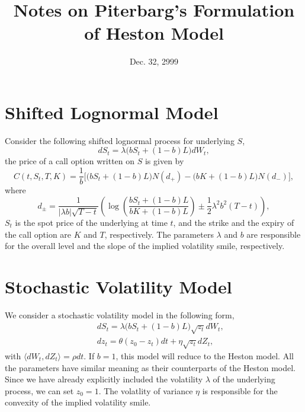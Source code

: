 \documentclass[12pt]{article}
\begin{document}
\title{Notes on Piterbarg's Formulation of Heston Model}
\date{Dec. 32, 2999}

\maketitle

\section{Shifted Lognormal Model}

  Consider the following shifted lognormal process for underlying $S$,
  \begin{equation}
    dS_t=\lambda \bigg(bS_t+\left(1-b\right)L\bigg)dW_t,
  \end{equation}
  the price of a call option written on $S$ is given by
  \begin{equation}
    C(t,S_t,T,K) = \frac{1}{b}\Big[\bigg(bS_t+\left(1-b\right)L\bigg)N\left(d_+\right)
                 - \bigg(bK+\left(1-b\right)L\bigg)N\left(d_-\right)\Big],
  \end{equation}
  where
  \begin{equation}
    d_{\pm} = \frac{1}{\left|\lambda b\right|\sqrt{T-t}}\left(\log\left(\frac{bS_t+\left(1-b\right)L}{bK+\left(1-b\right)L}\right)
            \pm \frac{1}{2}\lambda^2b^2(T-t)\right),
  \end{equation}
  $S_t$ is the spot price of the underlying at time $t$, and the strike and the expiry
  of the call option are $K$ and $T$, respectively. The parameters $\lambda$ and $b$ are
  responsible for the overall level and the slope of the implied volatility smile, respectively.

\section{Stochastic Volatility Model}

  We consider a stochastic volatility model in the following form,
  \begin{eqnarray}
    &&dS_t=\lambda \bigg(bS_t+\left(1-b\right)L\bigg)\sqrt{z_t}dW_t,\\
    &&dz_t=\theta(z_0-z_t)dt+\eta\sqrt{z_t}dZ_t,
  \end{eqnarray}
  with $\langle dW_t, dZ_t \rangle = \rho dt$. If $b=1$, this model will reduce to the
  Heston model. All the parameters have similar meaning as their counterparts of the
  Heston model. Since we have already explicitly included the volatility $\lambda$ of the underlying
  process, we can set $z_0=1$. The volatlity of variance $\eta$ is responsible for the
  convexity of the implied volatility smile.
\end{document}
